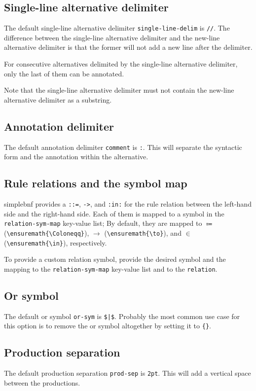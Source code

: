\documentclass[11pt]{article}
\begin{document}
\subsection{Single-line alternative delimiter}
The default single-line alternative delimiter \verb/single-line-delim/ is \verb|//|.
The difference between the single-line alternative delimiter and the new-line alternative delimiter is that the former will not add a new line after the delimiter.

For consecutive alternatives delimited by the single-line alternative delimiter, only the last of them can be annotated.

Note that the single-line alternative delimiter must not contain the new-line alternative delimiter as a substring.

\subsection{Annotation delimiter}
The default annotation delimiter \verb/comment/ is \verb/:/.
This will separate the syntactic form and the annotation within the alternative.

\subsection{Rule relations and the symbol map}
\textsf{simplebnf} provides a \verb/::=/, \verb/->/, and \verb/:in:/ for the rule relation between the left-hand side and the right-hand side.
Each of them is mapped to a symbol in the \verb/relation-sym-map/ key-value list; By default, they are mapped to $\Coloneqq$ (\verb/\ensuremath{\Coloneqq}/), $\to$ (\verb/\ensuremath{\to}/), and $\in$ (\verb/\ensuremath{\in}/), respectively.

To provide a custom relation symbol, provide the desired symbol and the mapping to the \verb/relation-sym-map/ key-value list and to the \verb/relation/.

\subsection{Or symbol}
The default or symbol \verb/or-sym/ is \verb/$|$/.
Probably the most common use case for this option is to remove the or symbol altogether by setting it to \verb/{}/.

\subsection{Production separation}
The default production separation \verb/prod-sep/ is \verb/2pt/.
This will add a vertical space between the productions.
\end{document}
